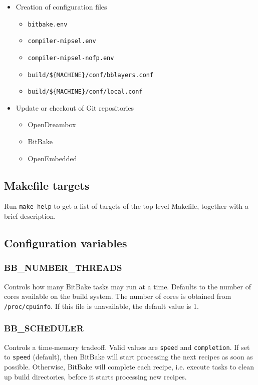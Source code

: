 \documentclass[a4paper]{article}
\newcommand{\shell}[1]{\texttt{\small #1}}
\begin{document}
  \begin{itemize}
    \item Creation of configuration files
      \begin{itemize}
        \item \shell{bitbake.env}
        \item \shell{compiler-mipsel.env}
        \item \shell{compiler-mipsel-nofp.env}
        \item \shell{build/\$\{MACHINE\}/conf/bblayers.conf}
        \item \shell{build/\$\{MACHINE\}/conf/local.conf}
      \end{itemize}
    \item Update or checkout of Git repositories
      \begin{itemize}
        \item OpenDreambox
        \item BitBake
        \item OpenEmbedded
      \end{itemize}
  \end{itemize}

  \subsection{Makefile targets}
    Run \shell{make help} to get a list of targets of the top level Makefile, together with a brief description.

  \subsection{Configuration variables}
    \subsubsection{BB\_NUMBER\_THREADS}
      Controls how many BitBake tasks may run at a time. Defaults to the
      number of cores available on the build system. The number of cores is
      obtained from \shell{/proc/cpuinfo}. If this file is unavailable, the
      default value is 1.

    \subsubsection{BB\_SCHEDULER}
      Controls a time-memory tradeoff. Valid values are \shell{speed} and
      \shell{completion}. If set to \shell{speed} (default), then BitBake
      will start processing the next recipes as soon as possible. Otherwise,
      BitBake will complete each recipe, i.e. execute tasks to clean up
      build directories, before it starts processing new recipes.
\end{document}
